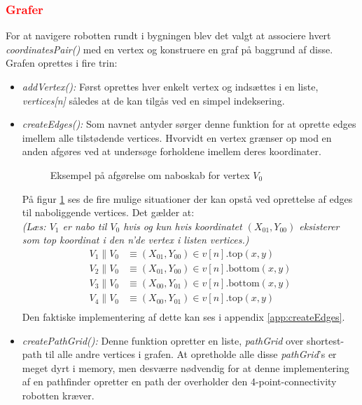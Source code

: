 \subsubsection{ \textcolor{red}{Grafer}}
For at navigere robotten rundt i bygningen blev det valgt at associere hvert \emph{coordinatesPair()} med en vertex og konstruere en graf på baggrund af disse. Grafen oprettes i fire trin:
\begin{itemize}
	\item \emph{addVertex():} Først oprettes hver enkelt vertex og indsættes i en liste, \emph{vertices[n]} således at de kan tilgås ved en simpel indeksering.
	\item \emph{createEdges():} Som navnet antyder sørger denne funktion for at oprette edges imellem alle tilstødende vertices. Hvorvidt en vertex grænser op mod en anden afgøres ved at undersøge forholdene imellem deres koordinater. 
\begin{figure}[h!]
	\label{fig:coordRelation}
	\caption{Eksempel på afgørelse om naboskab for vertex $V_0$}
\end{figure}
På figur \ref{fig:coordRelation} ses de fire mulige situationer der kan opstå ved oprettelse af edges til naboliggende vertices. Det gælder at: \\
\scriptsize\emph{(Læs: $V_1$ er nabo til $V_0$ hvis og kun hvis koordinatet $(X_{01},Y_{00})$ eksisterer som top koordinat i den n'de vertex i listen vertices.)}
\normalsize	 	 
	 \begin{align*}
	 V_1\parallel V_0 & \equiv(X_{01},Y_{00})\in v[n].\text{top}(x,y)	 \\
	 V_2\parallel V_0 & \equiv(X_{01},Y_{00})\in v[n].\text{bottom}(x,y)\\
	 V_3\parallel V_0 & \equiv(X_{00},Y_{01})\in v[n].\text{bottom}(x,y)\\
	 V_4\parallel V_0 & \equiv(X_{00},Y_{01})\in v[n].\text{top}(x,y)\\
	 \end{align*}
Den faktiske implementering af dette kan ses i appendix \ref{app:createEdges}.
	 \item \emph{createPathGrid():} Denne funktion opretter en liste, \emph{pathGrid} over shortest-path til alle andre vertices i grafen. At opretholde alle disse \emph{pathGrid}'s er meget dyrt i memory, men desværre nødvendig for at denne implementering af en pathfinder opretter en path der overholder den 4-point-connectivity robotten kræver.

\end{itemize}
